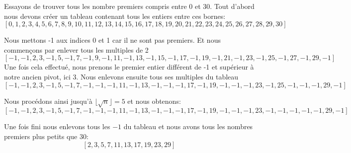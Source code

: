 \begin{example}
    Essayons de trouver tous les nombre premiers compris entre 0 et 30.
    Tout d'abord nous devons créer un tableau contenant tous les entiers entre ces bornes:
    \[[0, 1, 2, 3, 4, 5, 6, 7, 8, 9, 10, 11, 12, 13, 14, 15, 16, 17, 18, 19, 20, 21, 22, 23, 24, 25, 26, 27, 28, 29, 30]\]

    Nous mettons -1 aux indices 0 et 1 car il ne sont pas premiers. Et nous commençons par enlever tous les multiples de 2
    \[[-1, -1, 2, 3, -1, 5, -1, 7, -1, 9, -1, 11, -1, 13, -1, 15, -1, 17, -1, 19, -1, 21, -1, 23, -1, 25, -1, 27, -1, 29, -1]\]
    Une fois cela effectué, nous prenons le premier entier différent de -1 et supérieur à notre ancien pivot, ici 3. Nous enlevons ensuite tous ses multiples du tableau
    \[[-1, -1, 2, 3, -1, 5, -1, 7, -1, -1, -1, 11, -1, 13, -1, -1, -1, 17, -1, 19, -1, -1, -1, 23, -1, 25, -1, -1, -1, 29, -1]\]

    Nous procédons ainsi jusqu'à $\lfloor \sqrt{n} \rfloor = 5$ et nous obtenons:
    \[[-1, -1, 2, 3, -1, 5, -1, 7, -1, -1, -1, 11, -1, 13, -1, -1, -1, 17, -1, 19, -1, -1, -1, 23, -1, -1, -1, -1, -1, 29, -1]\]

    Une fois fini nous enlevons tous les $-1$ du tableau et nous avons tous les nombres premiers plus petits que 30:
    \[[2, 3, 5, 7, 11, 13, 17, 19, 23, 29]\]
\end{example}